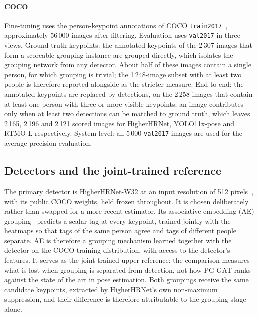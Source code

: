 \paragraph{COCO}
Fine-tuning uses the person-keypoint annotations of COCO \texttt{train2017}~\citep{lin2014coco},
approximately 56\,000 images after filtering.
Evaluation uses \texttt{val2017} in three views.
Ground-truth keypoints: the annotated keypoints of the 2\,307 images that form a scoreable grouping instance are
grouped directly, which isolates the grouping network from any detector.
About half of these images contain a single person, for which grouping is trivial;
the 1\,248-image subset with at least two people is therefore reported alongside as the stricter measure.
End-to-end: the annotated keypoints are replaced by detections,
on the 2\,258 images that contain at least one person with three or more visible keypoints;
an image contributes only when at least two detections can be matched to ground truth, which leaves 2\,165, 2\,196
and 2\,121 scored images for HigherHRNet, YOLO11x-pose and RTMO-L respectively.
System-level: all 5\,000 \texttt{val2017} images are used for the average-precision evaluation.

\subsection{Detectors and the joint-trained reference}
\label{sec:setup_detectors}

The primary detector is HigherHRNet-W32 at an input resolution of 512 pixels~\citep{cheng2020higherhrnet,sun2019hrnet},
with its public COCO weights, held frozen throughout.
It is chosen deliberately rather than swapped for a more recent estimator.
Its associative-embedding (AE) grouping~\citep{newell2017associative} predicts a scalar tag at every keypoint,
trained jointly with the heatmaps so that tags of the same person agree and tags of different people separate.
AE is therefore a grouping mechanism learned together with the detector on the COCO training distribution,
with access to the detector's features.
It serves as the joint-trained upper reference:
the comparison measures what is lost when grouping is separated from detection,
not how PG-GAT ranks against the state of the art in pose estimation.
Both groupings receive the same candidate keypoints, extracted by HigherHRNet's own non-maximum suppression,
and their difference is therefore attributable to the grouping stage alone.

